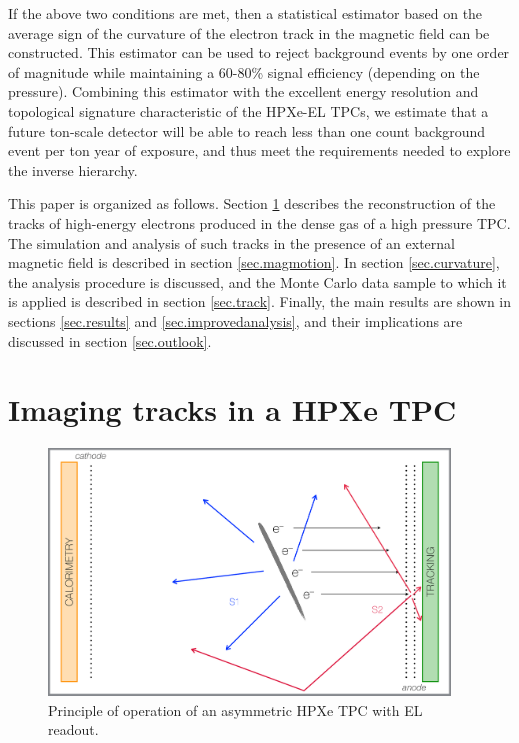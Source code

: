 \documentclass{JINST}
\begin{document}
If the above two conditions are met, then a statistical estimator based on the average sign of the curvature of the electron track in the magnetic field can be constructed.  This estimator can be used to reject background events by one order of magnitude while maintaining a 60-80\% signal efficiency (depending on the pressure). Combining this estimator with the excellent energy resolution and topological signature characteristic of the HPXe-EL TPCs, we estimate that a future ton-scale detector will be able to reach less than one count background event per ton year of exposure, and thus meet the requirements needed to explore the inverse hierarchy.

This paper is organized as follows.  Section \ref{sec.topology} describes the reconstruction of the tracks of high-energy electrons produced in the dense gas of a high pressure TPC.  The simulation and analysis of such tracks in the presence of an external magnetic field is described in section \ref{sec.magmotion}.  In section \ref{sec.curvature}, the analysis procedure is discussed, and the Monte Carlo data sample to which it is applied is described in section \ref{sec.track}.  Finally, the main results are shown in sections \ref{sec.results} and \ref{sec.improvedanalysis}, and their implications are discussed in section \ref{sec.outlook}.

\section{Imaging tracks in a HPXe TPC}
\label{sec.topology}

\begin{figure}[!htb]
\centering
\includegraphics[width= 0.95\textwidth]{img/SoftAsymmetric_bound.pdf}
\caption{Principle of operation of an asymmetric HPXe TPC with EL readout.} \label{fig.SS}
\end{figure}
\end{document}
